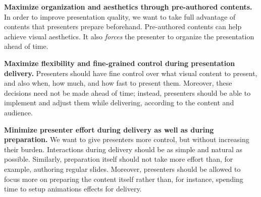 \textbf{Maximize organization and aesthetics through pre-authored contents.} In order to improve presentation quality, we want to take full advantage of contents that presenters prepare beforehand. Pre-authored contents can help achieve visual aesthetics. It also \textit{forces} the presenter to organize the presentation ahead of time. 
 
\textbf{Maximize flexibility and fine-grained control during presentation delivery.} Presenters should have fine control over what visual content to present, and also when, how much, and how fast to present them. Moreover, these decisions need not be made ahead of time; instead, presenters should be able to implement and adjust them while delivering, according to the content and audience. 

\textbf{Minimize presenter effort during delivery as well as during preparation.} We want to give presenters more control, but without increasing their burden. Interactions during delivery should be as simple and natural as possible. Similarly, preparation itself should not take more effort than, for example, authoring regular slides. Moreover, presenters should be allowed to focus more on preparing the content itself rather than, for instance, spending time to setup animations effects for delivery. 



